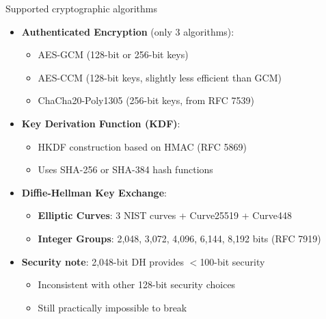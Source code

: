 \documentclass[aspectratio=169, lualatex, handout]{beamer}
\begin{document}
\begin{frame}{Supported cryptographic algorithms}
	\begin{itemize}
		\item \textbf{Authenticated Encryption} (only 3 algorithms):
		      \begin{itemize}
			      \item AES-GCM (128-bit or 256-bit keys)
			      \item AES-CCM (128-bit keys, slightly less efficient than GCM)
			      \item ChaCha20-Poly1305 (256-bit keys, from RFC 7539)
		      \end{itemize}
		\item \textbf{Key Derivation Function (KDF)}:
		      \begin{itemize}
			      \item HKDF construction based on HMAC (RFC 5869)
			      \item Uses SHA-256 or SHA-384 hash functions
		      \end{itemize}
		\item \textbf{Diffie-Hellman Key Exchange}:
		      \begin{itemize}
			      \item \textbf{Elliptic Curves}: 3 NIST curves + Curve25519 + Curve448
			      \item \textbf{Integer Groups}: 2,048, 3,072, 4,096, 6,144, 8,192 bits (RFC 7919)
		      \end{itemize}
		\item \textbf{Security note}: 2,048-bit DH provides $<$100-bit security
		      \begin{itemize}
			      \item Inconsistent with other 128-bit security choices
			      \item Still practically impossible to break
		      \end{itemize}
	\end{itemize}
\end{frame}
\end{document}
